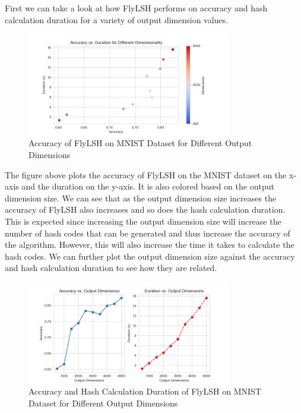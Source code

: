 \documentclass[12pt, letterpaper]{article}
\begin{document}
First we can take a look at how FlyLSH performs on accuracy and hash calculation duration for a variety of output dimension values. 

\begin{figure}[H]
    \centering
    \includegraphics[width=0.8\textwidth]{fly_hash.png}
    \caption{Accuracy of FlyLSH on MNIST Dataset for Different Output Dimensions}
    \label{fig:fly_hash}
\end{figure}

The figure above plots the accuracy of FlyLSH on the MNIST dataset on the x-axis and the duration on the y-axis. It is also colored based on the output dimension size. We can see that as the output dimension size increases the accuracy of FlyLSH also increases and so does the hash calculation duration. This is expected since increasing the output dimension size will increase the number of hash codes that can be generated and thus increase the accuracy of the algorithm. However, this will also increase the time it takes to calculate the hash codes. We can further plot the output dimension size against the accuracy and hash calculation duration to see how they are related.

\begin{figure}[H]
    \centering
    \includegraphics[width=0.8\textwidth]{fly_hash_compare_dim_accuracy_duration.png}
    \caption{Accuracy and Hash Calculation Duration of FlyLSH on MNIST Dataset for Different Output Dimensions}
    \label{fig:fly_hash_compare_dim_accuracy_duration}
\end{figure}
\end{document}

